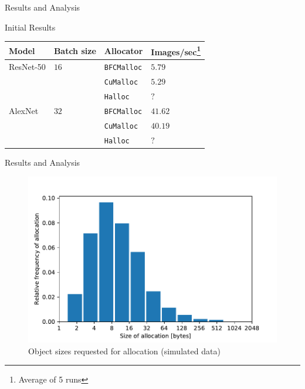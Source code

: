 \documentclass[10pt]{beamer}
\newcommand{\resnettimebfc}{$5.79$}     %
\newcommand{\resnettimecuda}{$5.29$}    %
\newcommand{\resnettimehalloc}{$?$}     %
\newcommand{\alexnettimebfc}{$41.62$}   %
\newcommand{\alexnettimecuda}{$40.19$}  %
\newcommand{\alexnettimehalloc}{$?$}    %
\begin{document}
\begin{frame}[fragile]{Results and Analysis}


\begin{exampleblock}{Initial Results}

    \begin{table}[!ht]
    \centering
    \label{tab:results}
    \begin{tabular}{|l|l|l|l|}
    \hline
    Model     & Batch size  & Allocator          & Images/sec\footnote{Average of 5 runs}         \\ \hline
    ResNet-50 & $16$        & \texttt{BFCMalloc} & \resnettimebfc     \\ \cline{3-4} 
              &             & \texttt{CuMalloc}  & \resnettimecuda    \\ \cline{3-4} 
              &             & \texttt{Halloc}    & \resnettimehalloc  \\ \hline
    AlexNet   & $32$        & \texttt{BFCMalloc} & \alexnettimebfc    \\ \cline{3-4} 
              &             & \texttt{CuMalloc}  & \alexnettimecuda   \\ \cline{3-4} 
              &             & \texttt{Halloc}    & \alexnettimehalloc \\ \hline
    \end{tabular}
    \end{table}
\end{exampleblock}

\end{frame}

\begin{frame}[fragile]{Results and Analysis}


\begin{figure}
  \centering
    \includegraphics[width=\textwidth]{../Quantitative_Python/histogram.pdf}
  \caption{Object sizes requested for allocation (simulated data)}
  \label{fig:hist}
\end{figure}

\end{frame}
\end{document}
